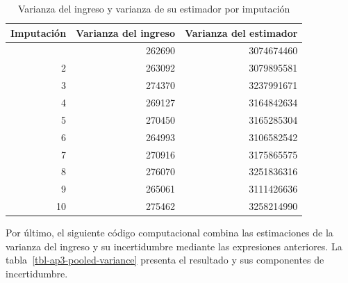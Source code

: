 \documentclass[
  spanish,
  11pt,
  letterpaper,
  oneside,
  open=any]{scrbook}
\newenvironment{Shaded}{\begin{snugshade}}{\end{snugshade}}
\newcommand{\DecValTok}[1]{\textcolor[rgb]{0.68,0.00,0.00}{#1}}
\newcommand{\FunctionTok}[1]{\textcolor[rgb]{0.28,0.35,0.67}{#1}}
\newcommand{\NormalTok}[1]{\textcolor[rgb]{0.00,0.23,0.31}{#1}}
\newcommand{\OtherTok}[1]{\textcolor[rgb]{0.00,0.23,0.31}{#1}}
\newcommand{\SpecialCharTok}[1]{\textcolor[rgb]{0.37,0.37,0.37}{#1}}
\begin{document}
{

\begin{longtable}[]{@{}rrr@{}}

\caption{\label{tbl-ap3-organize-variances-imputation}Varianza del
ingreso y varianza de su estimador por imputación}

\tabularnewline

\toprule\noalign{}
Imputación & Varianza del ingreso & Varianza del estimador \\
\midrule\noalign{}
\endhead
\bottomrule\noalign{}
\endlastfoot
1 & 262690 & 3074674460 \\
2 & 263092 & 3079895581 \\
3 & 274370 & 3237991671 \\
4 & 269127 & 3164842634 \\
5 & 270450 & 3165285304 \\
6 & 264993 & 3106582542 \\
7 & 270916 & 3175865575 \\
8 & 276070 & 3251836316 \\
9 & 265061 & 3111426636 \\
10 & 275462 & 3258214990 \\

\end{longtable}

}

Por último, el siguiente código computacional combina las estimaciones
de la varianza del ingreso y su incertidumbre mediante las expresiones
anteriores. La tabla~\ref{tbl-ap3-pooled-variance} presenta el resultado
y sus componentes de incertidumbre.

\begin{Shaded}
\end{Shaded}
\end{document}
